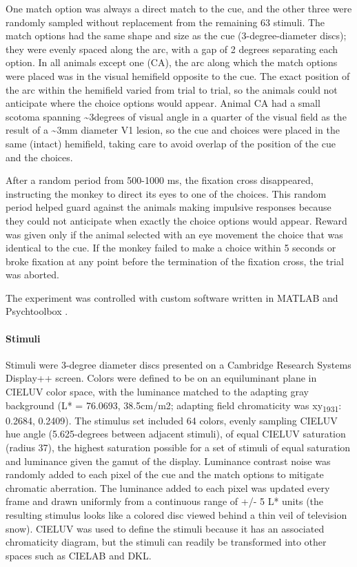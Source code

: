 One match option was always a direct match to the cue, and the other three were randomly sampled without replacement from the remaining 63 stimuli. The match options had the same shape and size as the cue (3-degree-diameter discs); they were evenly spaced along the arc, with a gap of 2 degrees separating each option. In all animals except one (CA), the arc along which the match options were placed was in the visual hemifield opposite to the cue. The exact position of the arc within the hemifield varied from trial to trial, so the animals could not anticipate where the choice options would appear. Animal CA had a small scotoma spanning \textasciitilde3degrees of visual angle in a quarter of the visual field as the result of a \textasciitilde3mm diameter V1 lesion, so the cue and choices were placed in the same (intact) hemifield, taking care to avoid overlap of the position of the cue and the choices. 

After a random period from 500-1000 ms, the fixation cross disappeared, instructing the monkey to direct its eyes to one of the choices. This random period helped guard against the animals making impulsive responses because they could not anticipate when exactly the choice options would appear. Reward was given only if the animal selected with an eye movement the choice that was identical to the cue. 
If the monkey failed to make a choice within 5 seconds or broke fixation at any point before the termination of the fixation cross, the trial was aborted.

The experiment was controlled with custom software written in MATLAB and Psychtoolbox \citep{noauthor_nei-lsrkofiko_2022, kleiner_whats_2007}.

\paragraph{Stimuli}
Stimuli were 3-degree diameter discs presented on a Cambridge Research Systems Display++ screen. 
Colors were defined to be on an equiluminant plane in CIELUV color space, with the luminance matched to the adapting gray background (L* = 76.0693, 38.5cm/m2; adapting field chromaticity was xy\textsubscript{1931}: 0.2684, 0.2409). 
The stimulus set included 64 colors, evenly sampling CIELUV hue angle (5.625-degrees between adjacent stimuli), of equal CIELUV saturation (radius 37), the highest saturation possible for a set of stimuli of equal saturation and luminance given the gamut of the display.
Luminance contrast noise was randomly added to each pixel of the cue and the match options to mitigate chromatic aberration. 
The luminance added to each pixel was updated every frame and drawn uniformly from a continuous range of +/- 5 L* units (the resulting stimulus looks like a colored disc viewed behind a thin veil of television snow). 
CIELUV was used to define the stimuli because it has an associated chromaticity diagram, but the stimuli can readily be transformed into other spaces such as CIELAB and DKL. 

